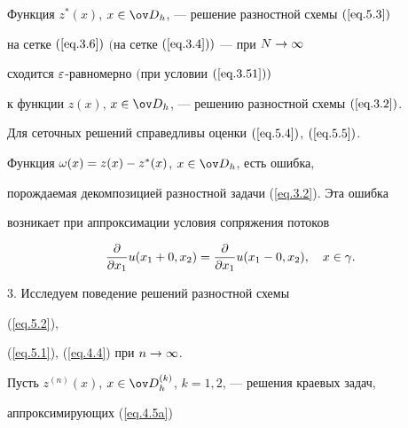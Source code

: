 \begin{thms} \label{t.5.1}


Функция $z^*(x)$, $x\in \od_h$, --- решение разностной схемы $(\ref{eq.5.3})$


на сетке $(\ref{eq.3.6})$ $($на сетке $(\ref{eq.3.4}))$ --- при $N\rightarrow\infty$


сходится $\varepsilon$-равномерно $($при условии $(\ref{eq.3.51}))$


к функции $z(x)$, $ x\in\od_h$, --- решению разностной схемы $(\ref{eq.3.2})$.


Для сеточных решений справедливы оценки $(\ref{eq.5.4})$, $(\ref{eq.5.5})$.


\end{thms}





\begin{notes}


Функция $\omega(x)=z(x)-z^*(x)$, $ x\in\od_h$, есть ошибка,


порождаемая декомпозицией разностной задачи (\ref{eq.3.2}). Эта ошибка


возникает при аппроксимации условия сопряжения потоков


\begin{equation} \label{eq.5.6}


\frac{\pad}{\pad x_1} u(x_1+0, x_2) = \frac{\pad}{\pad x_1} u(x_1-0, x_2),


\quad x\in \gamma.


\end{equation}


\end{notes}





3. Исследуем поведение решений разностной схемы


(\ref{eq.5.2}),




(\ref{eq.5.1}), (\ref{eq.4.4}) при $n\rightarrow\infty$.





Пусть $z^{(n)}(x)$, $x\in\od^{(k)}_h$, $k=1,2$, --- решения краевых задач,


аппроксимирующих (\ref{eq.4.5a})




